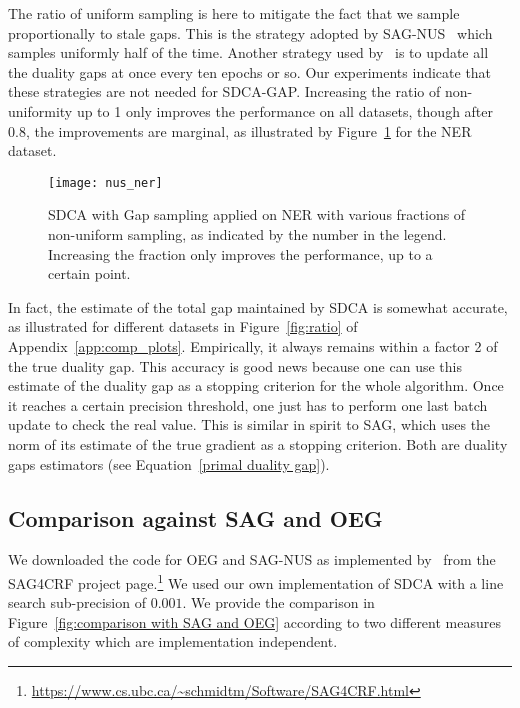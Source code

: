 The ratio of uniform sampling is here to mitigate the fact that we sample proportionally to stale gaps.
This is the strategy adopted by SAG-NUS~\citep{schmidt2015non} which samples uniformly half of the time.
Another strategy used by~\citet{osokin2016minding} is to update all the duality gaps at once every ten epochs or so.
Our experiments indicate that these strategies are not needed for SDCA-GAP.
Increasing the ratio of non-uniformity up to 1 only improves the performance on all datasets, though after 0.8, the improvements are marginal, as illustrated by Figure~\ref{fig:non-uniformity} for the NER dataset.
\begin{figure}[t]
	\centering \texttt{[image: nus\_ner]}
	\caption[SDCA with Gap sampling applied on NER]{SDCA with Gap sampling applied on NER with various fractions of non-uniform sampling, as indicated by the number in the legend.
		Increasing the fraction only improves the performance, up to a certain point.}
	\label{fig:non-uniformity}
\end{figure}

In fact, the estimate of the total gap maintained by SDCA is somewhat accurate, as illustrated for different datasets in Figure~\ref{fig:ratio} of Appendix~\ref{app:comp_plots}.
Empirically, it always remains within a factor 2 of the true duality gap.
This accuracy is good news because one can use this estimate of the duality gap as a stopping criterion for the whole algorithm.
Once it reaches a certain precision threshold, one just has to perform one last batch update to check the real value.
This is similar in spirit to SAG, which uses the norm of its estimate of the true gradient as a stopping criterion.
Both are duality gaps estimators (see Equation~\eqref{primal duality gap}).


\subsection{Comparison against SAG and OEG}

We downloaded the code for OEG and SAG-NUS as implemented by~\citet{schmidt2015non} from the SAG4CRF project page.\footnote{\url{https://www.cs.ubc.ca/~schmidtm/Software/SAG4CRF.html}}
We used our own implementation of SDCA with a line search sub-precision of $0.001$.
We provide the comparison in Figure~\ref{fig:comparison with SAG and OEG} according to two different measures of complexity which are implementation independent.

